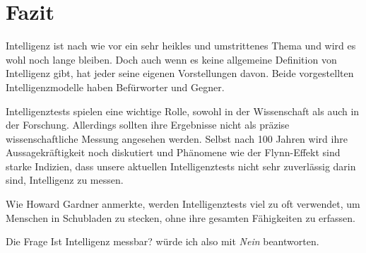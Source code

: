 \chapter{Fazit}
Intelligenz ist nach wie vor ein sehr heikles und umstrittenes Thema und wird es wohl noch lange bleiben. Doch auch wenn es keine allgemeine Definition von Intelligenz gibt, hat jeder seine eigenen Vorstellungen davon. Beide vorgestellten Intelligenzmodelle haben Befürworter und Gegner.

Intelligenztests spielen eine wichtige Rolle, sowohl in der Wissenschaft als auch in der Forschung. Allerdings sollten ihre Ergebnisse nicht als präzise wissenschaftliche Messung angesehen werden. Selbst nach 100 Jahren wird ihre Aussagekräftigkeit noch diskutiert und Phänomene wie der Flynn-Effekt sind starke Indizien, dass unsere aktuellen Intelligenztests nicht sehr zuverlässig darin sind, Intelligenz zu messen.

Wie Howard Gardner anmerkte, werden Intelligenztests viel zu oft verwendet, um Menschen in Schubladen zu stecken, ohne ihre gesamten Fähigkeiten zu erfassen.

Die Frage \glqq Ist Intelligenz messbar?\grqq{} würde ich also mit \emph{Nein} beantworten.
